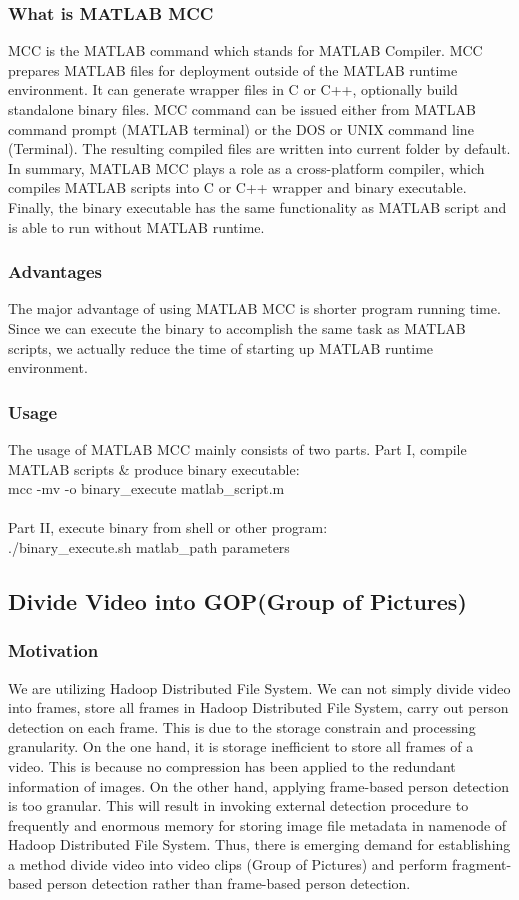 \subsubsection{What is MATLAB MCC}
MCC is the MATLAB command which stands for MATLAB Compiler. MCC prepares MATLAB 
files for deployment outside of the MATLAB runtime environment. It can generate 
wrapper files in C or C++, optionally build standalone binary files.
MCC command can be issued either from MATLAB command prompt (MATLAB terminal) or
the DOS or UNIX command line (Terminal). The resulting compiled files are
written  into current folder by default.
In summary, MATLAB MCC plays a role as a cross-platform compiler, which compiles
MATLAB scripts into C or C++ wrapper and binary executable. Finally, the binary 
executable has the same functionality as MATLAB script and is able to run without MATLAB runtime.

\subsubsection{Advantages}
The major advantage of using MATLAB MCC is shorter program running time. Since
we can execute the binary to accomplish the same task as MATLAB scripts, we
actually reduce the time of starting up MATLAB runtime environment.

\subsubsection{Usage}
The usage of MATLAB MCC mainly consists of two parts. 
Part I, compile MATLAB scripts \& produce binary executable: \\
mcc -mv -o binary\_execute  matlab\_script.m \\\\
Part II, execute binary from shell or other program: \\	
./binary\_execute.sh matlab\_path parameters


\subsection{Divide Video into GOP(Group of Pictures)} \label{sec:gop}
\subsubsection{Motivation}
We are utilizing Hadoop Distributed File System. We can not simply divide video
into frames, store all frames in Hadoop Distributed File System, carry out
person detection on each frame. This is due to the storage constrain and
processing granularity. On the one hand, it is storage inefficient to store all 
frames of a video. This is because no compression has been applied to the
redundant information of images. On the other hand, applying frame-based person 
detection is too granular. This will result in invoking external detection
procedure to frequently and enormous memory for storing image file metadata in 
namenode of Hadoop Distributed File System. Thus, there is emerging demand for 
establishing a method divide video into video clips (Group of Pictures) and
perform fragment-based person detection rather than frame-based person detection.

